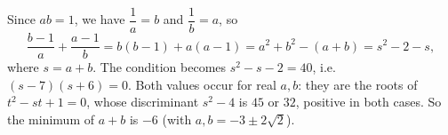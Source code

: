 Since $ab=1$, we have $\dfrac{1}{a}=b$ and $\dfrac{1}{b}=a$, so
\[
\dfrac{b-1}{a}+\dfrac{a-1}{b}=b(b-1)+a(a-1)=a^2+b^2-(a+b)=s^2-2-s,
\]
where $s=a+b$. The condition becomes $s^2-s-2=40$, i.e.\ $(s-7)(s+6)=0$. Both values occur for real $a,b$: they are the roots of $t^2-st+1=0$, whose discriminant $s^2-4$ is $45$ or $32$, positive in both cases. So the minimum of $a+b$ is $\boxed{-6}$ (with $a,b=-3\pm2\sqrt2$).

